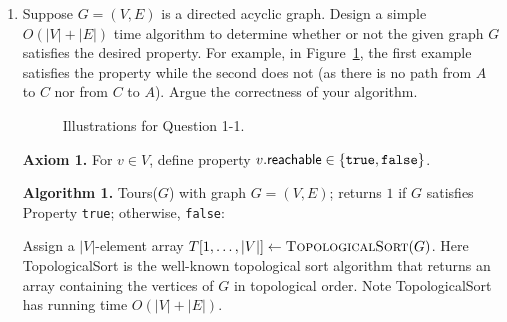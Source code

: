 \begin{enumerate}
\item Suppose $G = (V, E)$ is a directed acyclic graph. Design a simple $O(|V|+|E|)$ time algorithm to determine whether or not the given graph $G$ satisfies the desired property. For example, in Figure~\ref{fig:q1-1}, the first example satisfies the property while the second does not (as there is no path from $A$ to $C$ nor from $C$ to $A$).
Argue the correctness of your algorithm.

\begin{figure}[htb]
    \centering
    \caption{Illustrations for Question 1-1.}
    \label{fig:q1-1}
\end{figure}
\begin{solution}

\textbf{Axiom 1. }For $v\in V$, define property $v.\mathsf{reachable}\in\{\verb|true|,\verb|false|\}$.

\textbf{Algorithm 1. }{\sc Tours}($G$) with graph $G=(V,E)$; returns $1$ if $G$ satisfies Property \verb|true|; otherwise, \verb|false|:

Assign a $|V|$-element array $T[1,\dots,|V|]\leftarrow\textsc{TopologicalSort}(G)$. Here {\sc TopologicalSort} is the well-known topological sort algorithm that returns an array containing the vertices of $G$ in topological order. Note {\sc TopologicalSort} has running time $O(|V|+|E|)$.


\end{solution}
\end{enumerate}
